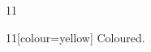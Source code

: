 \documentclass[paper=A4]{ropas-poster}
\begin{document}
\begin{postergrid}{1}{1}
\begin{posterblock}{1}{1}[colour=yellow]
Coloured.
\end{posterblock}
\end{postergrid}
\end{document}
